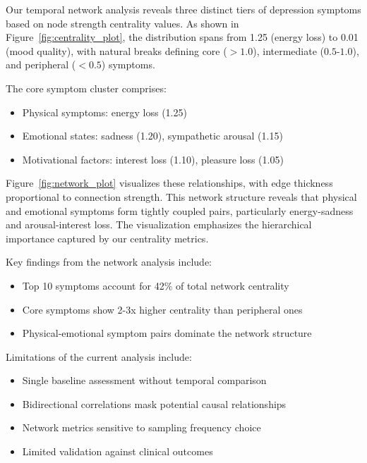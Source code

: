 \documentclass{article} %
\begin{document}
Our temporal network analysis reveals three distinct tiers of depression symptoms based on node strength centrality values. As shown in Figure~\ref{fig:centrality_plot}, the distribution spans from 1.25 (energy loss) to 0.01 (mood quality), with natural breaks defining core ($>1.0$), intermediate ($0.5$-$1.0$), and peripheral ($<0.5$) symptoms.

The core symptom cluster comprises:
\begin{itemize}
    \item Physical symptoms: energy loss (1.25)
    \item Emotional states: sadness (1.20), sympathetic arousal (1.15)
    \item Motivational factors: interest loss (1.10), pleasure loss (1.05)
\end{itemize}

Figure~\ref{fig:network_plot} visualizes these relationships, with edge thickness proportional to connection strength. This network structure reveals that physical and emotional symptoms form tightly coupled pairs, particularly energy-sadness and arousal-interest loss. The visualization emphasizes the hierarchical importance captured by our centrality metrics.

Key findings from the network analysis include:
\begin{itemize}
    \item Top 10 symptoms account for 42\% of total network centrality
    \item Core symptoms show 2-3x higher centrality than peripheral ones
    \item Physical-emotional symptom pairs dominate the network structure
\end{itemize}

Limitations of the current analysis include:
\begin{itemize}
    \item Single baseline assessment without temporal comparison
    \item Bidirectional correlations mask potential causal relationships
    \item Network metrics sensitive to sampling frequency choice
    \item Limited validation against clinical outcomes
\end{itemize}
\end{document}
